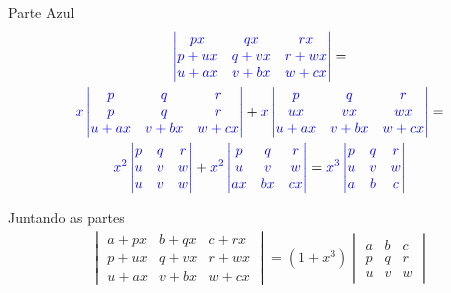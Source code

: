 \documentclass{beamer}
\begin{document}
\begin{frame}{Parte Azul}
  \begin{gather*}
    \textcolor{blue}{\begin{vmatrix}
      px & qx & rx \\
      p+ux & q+vx & r+wx \\
      u+ ax & v+bx & w + cx
    \end{vmatrix}} = \\
    \textcolor{blue}{x\begin{vmatrix}
      p & q & r \\
      p & q & r \\
      u+ ax & v+bx & w + cx
    \end{vmatrix}} + \textcolor{blue}{x\begin{vmatrix}
      p & q & r \\
      ux & vx & wx \\
      u+ ax & v+bx & w + cx
    \end{vmatrix}} =\\
    \textcolor{blue}{x^2\begin{vmatrix}
      p & q & r \\
      u & v & w \\
      u  & v & w 
    \end{vmatrix}} + \textcolor{blue}{x^2\begin{vmatrix}
      p & q & r \\
      u & v & w \\
      ax & bx & cx
    \end{vmatrix}}=\textcolor{blue}{x^3\begin{vmatrix}
      p & q & r \\
      u & v & w \\
      a & b & c
    \end{vmatrix}}
  \end{gather*}
\end{frame}

\begin{frame}{Juntando as partes}
  \begin{gather*}
    \begin{vmatrix}
      a+px & b+qx & c+rx \\
      p+ux & q+vx & r+wx \\
      u+ ax & v+bx & w + cx
    \end{vmatrix}= (1+x^3)\begin{vmatrix}
      a & b & c \\
      p & q & r \\
      u & v & w 
    \end{vmatrix}
  \end{gather*} 
\end{frame}
 
\end{document}
